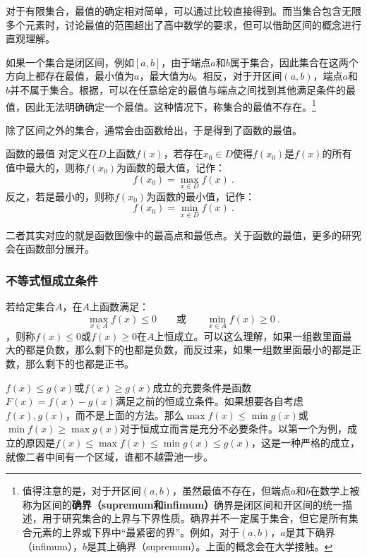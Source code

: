 对于有限集合，最值的确定相对简单，可以通过比较直接得到。而当集合包含无限多个元素时，讨论最值的范围超出了高中数学的要求，但可以借助区间的概念进行直观理解。

如果一个集合是闭区间，例如$[a, b]$，由于端点$a$和$b$属于集合，因此集合在这两个方向上都存在最值，最小值为$a$，最大值为$b$。相反，对于开区间$(a, b)$，端点$a$和$b$并不属于集合。根据，可以在任意给定的最值与端点之间找到其他满足条件的最值，因此无法明确确定一个最值。这种情况下，称集合的最值不存在。\footnote{值得注意的是，对于开区间$(a, b)$，虽然最值不存在，但端点$a$和$b$在数学上被称为区间的\textbf{确界（supremum和infimum）}确界是闭区间和开区间的统一描述，用于研究集合的上界与下界性质。确界并不一定属于集合，但它是所有集合元素的上界或下界中“最紧密的界”。例如，对于$(a, b)$，$a$是其下确界（infimum），$b$是其上确界（supremum）。上面的概念会在大学接触。}

除了区间之外的集合，通常会由函数给出，于是得到了函数的最值。

\begin{definition}{函数的最值}
对定义在$D$上函数$f(x)$，若存在$x_0\in D$使得$f(x_0)$是$f(x)$的所有值中最大的，则称$f(x_0)$为函数的最大值，记作：
\begin{equation}
f(x_0) = \max_{x \in D} f(x)~.
\end{equation}
反之，若是最小的，则称$f(x_0)$为函数的最小值，记作：
\begin{equation}
f(x_0) = \min_{x \in D} f(x)~.
\end{equation}
\end{definition}

二者其实对应的就是函数图像中的最高点和最低点。关于函数的最值，更多的研究会在函数部分展开。

\subsubsection{不等式恒成立条件}

若给定集合$A$，在$A$上函数满足：
\begin{equation}
\displaystyle\max_{x\in A} f(x)\leq 0\qquad\text{或}\qquad\min_{x\in A} f(x)\geq 0~.
\end{equation}
，则称$f(x)\leq 0$或$f(x)\geq 0$在$A$上恒成立。可以这么理解，如果一组数里面最大的都是负数，那么剩下的也都是负数，而反过来，如果一组数里面最小的都是正数，那么剩下的也都是正书。

$f(x)\leq g(x)$或$f(x)\geq g(x)$成立的充要条件是函数$F(x)=f(x)-g(x)$满足之前的恒成立条件。如果想要各自考虑$f(x),g(x)$，而不是上面的方法。那么$\max f(x)\leq\min g(x)$或$\min f(x)\geq\max g(x)$对于恒成立而言是充分不必要条件。以第一个为例，成立的原因是$f(x)\leq\max f(x)\leq\min g(x)\leq g(x)$，这是一种严格的成立，就像二者中间有一个区域，谁都不越雷池一步。

